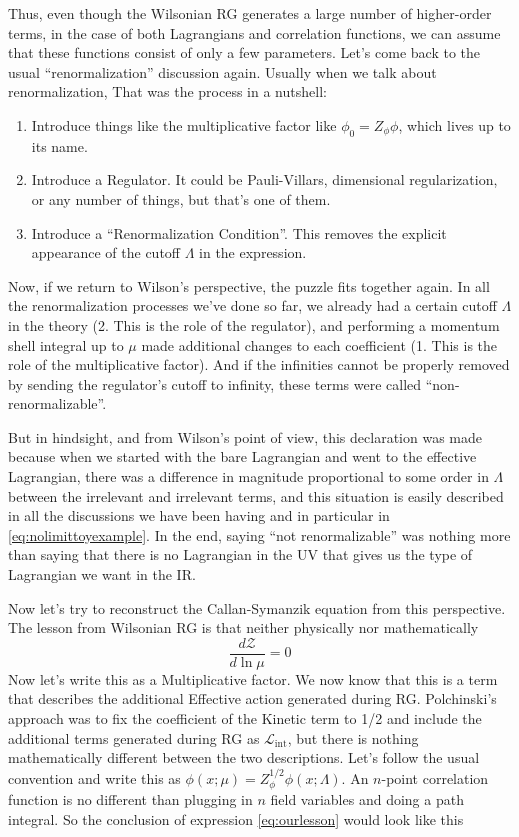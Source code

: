 \documentclass[12pt,halfline,a4paper]{ouparticle}
\begin{document}
Thus, even though the Wilsonian RG generates a large number of higher-order terms, in the case of both Lagrangians and correlation functions, we can assume that these functions consist of only a few parameters.
Let's come back to the usual “renormalization” discussion again. Usually when we talk about renormalization, That was the process in a nutshell:
\begin{enumerate}
	\item Introduce things like the multiplicative factor like $\phi_0 = Z_\phi\phi$, which lives up to its name.
	\item Introduce a Regulator. It could be Pauli-Villars, dimensional regularization, or any number of things, but that's one of them.
	\item Introduce a “Renormalization Condition”. This removes the explicit appearance of the cutoff $\Lambda$ in the expression.
\end{enumerate}

Now, if we return to Wilson's perspective, the puzzle fits together again. In all the renormalization processes we've done so far, we already had a certain cutoff $\Lambda$ in the theory (2. This is the role of the regulator), and performing a momentum shell integral up to $\mu$ made additional changes to each coefficient (1. This is the role of the multiplicative factor).
And if the infinities cannot be properly removed by sending the regulator's cutoff to infinity, these terms were called “non-renormalizable”.

But in hindsight, and from Wilson's point of view, this declaration was made because when we started with the bare Lagrangian and went to the effective Lagrangian, there was a difference in magnitude proportional to some order in $\Lambda$ between the irrelevant and irrelevant terms, and this situation is easily described in all the discussions we have been having and in particular in \ref{eq:nolimittoyexample}.
In the end, saying “not renormalizable” was nothing more than saying that there is no Lagrangian in the UV that gives us the type of Lagrangian we want in the IR.

Now let's try to reconstruct the Callan-Symanzik equation from this perspective. The lesson from Wilsonian RG is that neither physically nor mathematically  
\begin{equation}
	\label{eq:ourlesson}
	\frac{d \mathcal Z}{d \ln \mu} = 0
\end{equation}
Now let's write this as a Multiplicative factor. We now know that this is a term that describes the additional Effective action generated during RG. Polchinski's approach was to fix the coefficient of the Kinetic term to 1/2 and include the additional terms generated during RG as $\mathcal L_\text{int}$, but there is nothing mathematically different between the two descriptions.
Let's follow the usual convention and write this as $\phi(x;\mu)=Z^{1/2}_\phi\phi(x;\Lambda)$. An $n$-point correlation function is no different than plugging in $n$ field variables and doing a path integral. So the conclusion of expression \ref{eq:ourlesson} would look like this
\end{document}
